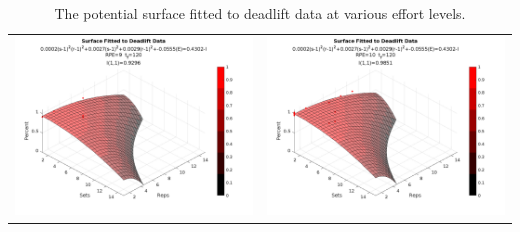 \begin{table}[h]
\begin{tabular}{c|c}
        \includegraphics[width=80mm]{DeadliftSurface/9.png} &
        \includegraphics[width=80mm]{DeadliftSurface/10.png} \\
    \end{tabular}
    \caption{The potential surface fitted to deadlift data at various effort levels.}
    \label{tab:AppBDeadliftPotentialSurfaceAcrossEffort}
\end{table}